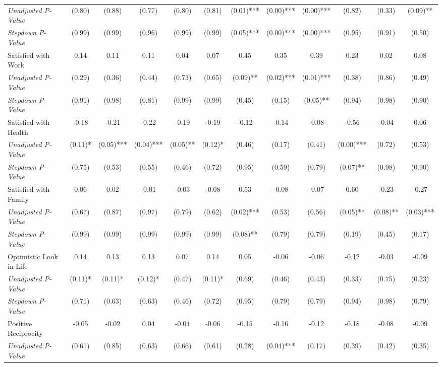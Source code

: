 \begin{tabular}{l c c c c c c c c c c c}
\quad \textit{Unadjusted P-Value} & (0.80) & (0.88) & (0.77) & (0.80) & (0.81) & (0.01)*** & (0.00)*** & (0.00)*** & (0.82) & (0.33) & (0.09)** \\
\quad \textit{Stepdown P-Value} & (0.99) & (0.99) & (0.96) & (0.99) & (0.99) & (0.05)*** & (0.00)*** & (0.00)*** & (0.95) & (0.91) & (0.50) \\
Satisfied with Work & 0.14 & 0.11 & 0.11 & 0.04 & 0.07 & 0.45 & 0.35 & 0.39 & 0.23 & 0.02 & 0.08 \\
\quad \textit{Unadjusted P-Value} & (0.29) & (0.36) & (0.44) & (0.73) & (0.65) & (0.09)** & (0.02)*** & (0.01)*** & (0.38) & (0.86) & (0.49) \\
\quad \textit{Stepdown P-Value} & (0.91) & (0.98) & (0.81) & (0.99) & (0.99) & (0.45) & (0.15) & (0.05)** & (0.94) & (0.98) & (0.90) \\
Satisfied with Health & -0.18 & -0.21 & -0.22 & -0.19 & -0.19 & -0.12 & -0.14 & -0.08 & -0.56 & -0.04 & 0.06 \\
\quad \textit{Unadjusted P-Value} & (0.11)* & (0.05)*** & (0.04)*** & (0.05)** & (0.12)* & (0.46) & (0.17) & (0.41) & (0.00)*** & (0.72) & (0.53) \\
\quad \textit{Stepdown P-Value} & (0.75) & (0.53) & (0.55) & (0.46) & (0.72) & (0.95) & (0.59) & (0.79) & (0.07)** & (0.98) & (0.90) \\
Satisfied with Family & 0.06 & 0.02 & -0.01 & -0.03 & -0.08 & 0.53 & -0.08 & -0.07 & 0.60 & -0.23 & -0.27 \\
\quad \textit{Unadjusted P-Value} & (0.67) & (0.87) & (0.97) & (0.79) & (0.62) & (0.02)*** & (0.53) & (0.56) & (0.05)** & (0.08)** & (0.03)*** \\
\quad \textit{Stepdown P-Value} & (0.99) & (0.99) & (0.99) & (0.99) & (0.99) & (0.08)** & (0.79) & (0.79) & (0.19) & (0.45) & (0.17) \\
Optimistic Look in Life & 0.14 & 0.13 & 0.13 & 0.07 & 0.14 & 0.05 & -0.06 & -0.06 & -0.12 & -0.03 & -0.09 \\
\quad \textit{Unadjusted P-Value} & (0.11)* & (0.11)* & (0.12)* & (0.47) & (0.11)* & (0.69) & (0.46) & (0.43) & (0.33) & (0.75) & (0.23) \\
\quad \textit{Stepdown P-Value} & (0.71) & (0.63) & (0.63) & (0.46) & (0.72) & (0.95) & (0.79) & (0.79) & (0.94) & (0.98) & (0.79) \\
Positive Reciprocity & -0.05 & -0.02 & 0.04 & -0.04 & -0.06 & -0.15 & -0.16 & -0.12 & -0.18 & -0.08 & -0.09 \\
\quad \textit{Unadjusted P-Value} & (0.61) & (0.85) & (0.63) & (0.66) & (0.61) & (0.28) & (0.04)*** & (0.17) & (0.39) & (0.42) & (0.35) \\

\end{tabular}
